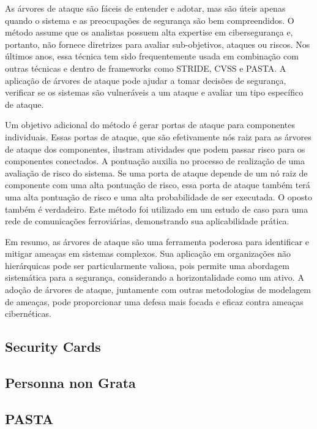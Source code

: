 As árvores de ataque são fáceis de entender e adotar, mas são úteis apenas
quando o sistema e as preocupações de segurança são bem compreendidos. O método
assume que os analistas possuem alta expertise em cibersegurança e, portanto, não
fornece diretrizes para avaliar sub-objetivos, ataques ou riscos.
Nos últimos anos, essa técnica tem sido frequentemente usada em combinação com
outras técnicas e dentro de frameworks como STRIDE, CVSS e PASTA.
A aplicação de árvores de ataque pode ajudar a tomar decisões de segurança,
verificar se os sistemas são vulneráveis a um ataque e avaliar um tipo específico de
ataque. 

Um objetivo adicional do método é gerar portas de ataque para componentes
individuais. Essas portas de ataque, que são efetivamente nós raiz para as árvores de
ataque dos componentes, ilustram atividades que podem passar risco para os
componentes conectados. A pontuação auxilia no processo de realização de uma avaliação de
risco do sistema. Se uma porta de ataque depende de um nó raiz de componente com uma
alta pontuação de risco, essa porta de ataque também terá uma alta pontuação de
risco e uma alta probabilidade de ser executada. O oposto também é verdadeiro.
Este método foi utilizado em um estudo de caso para uma rede de comunicações
ferroviárias, demonstrando sua aplicabilidade prática. 

Em resumo, as árvores de ataque são uma ferramenta poderosa para identificar e
mitigar ameaças em sistemas complexos. Sua aplicação em organizações não hierárquicas
pode ser particularmente valiosa, pois permite uma abordagem sistemática para a
segurança, considerando a horizontalidade como um ativo. A adoção de árvores de ataque,
juntamente com outras metodologias de modelagem de ameaças, pode proporcionar uma defesa
mais focada e eficaz contra ameaças cibernéticas. 

\subsection{Security Cards}
\label{sec:Security Cards}

\subsection{Personna non Grata}
\label{sec:Personna}

\subsection{PASTA}
\label{sec:PASTA}



